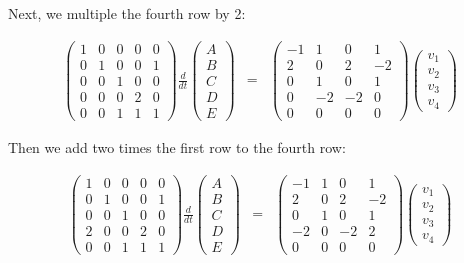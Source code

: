 \documentclass{article}
\begin{document}
Next, we multiple the fourth row by 2:

\begin{eqnarray*}
\begin{pmatrix} 1 & 0 & 0 & 0 & 0\\ 0 & 1 & 0 & 0 &1\\ 0 & 0 & 1 & 0 & 0\\ 0 & 0 & 0& 2 & 0\\ 0 & 0 & 1 & 1 & 1\end{pmatrix}
\frac{d}{dt} \begin{pmatrix} A\\ B \\ C\\ D\\ E \end{pmatrix} 
& = & \begin{pmatrix} -1 & 1 & 0 & 1\\
2 & 0 & 2 & -2\\
0 & 1 & 0 & 1\\
0 & -2 & -2 & 0\\
0 & 0 & 0 & 0
\end{pmatrix} \begin{pmatrix} v_1\\ v_2 \\ v_3 \\ v_4 \end{pmatrix}
\end{eqnarray*}

Then we add two times the first row to the fourth row:

\begin{eqnarray*}
\begin{pmatrix} 1 & 0 & 0 & 0 & 0\\ 0 & 1 & 0 & 0 &1\\ 0 & 0 & 1 & 0 & 0\\ 2 & 0 & 0& 2 & 0\\ 0 & 0 & 1 & 1 & 1\end{pmatrix}
\frac{d}{dt} \begin{pmatrix} A\\ B \\ C\\ D\\ E \end{pmatrix} 
& = & \begin{pmatrix} -1 & 1 & 0 & 1\\
2 & 0 & 2 & -2\\
0 & 1 & 0 & 1\\
-2 & 0 & -2 & 2\\
0 & 0 & 0 & 0
\end{pmatrix} \begin{pmatrix} v_1\\ v_2 \\ v_3 \\ v_4 \end{pmatrix}
\end{eqnarray*}
\end{document}
